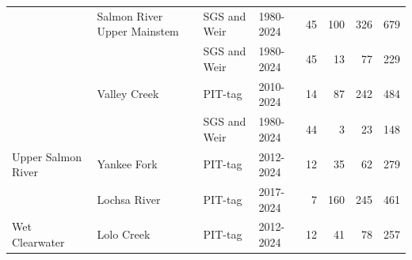 \documentclass[12pt,a4paper]{article}
\begin{document}
\begin{table}
\begin{tabular}[t]{llllrrrr}
 & Salmon River Upper Mainstem & SGS and Weir & 1980-2024 & 45 & 100 & 326 & 679\\

 &  & SGS and Weir & 1980-2024 & 45 & 13 & 77 & 229\\

 & \multirow[t]{-2}{*}{\raggedright\arraybackslash Valley Creek} & PIT-tag & 2010-2024 & 14 & 87 & 242 & 484\\

 &  & SGS and Weir & 1980-2024 & 44 & 3 & 23 & 148\\

\multirow[t]{-13}{*}[8\dimexpr\aboverulesep+\belowrulesep+\cmidrulewidth]{\raggedright\arraybackslash Upper Salmon River} & \multirow[t]{-2}{*}{\raggedright\arraybackslash Yankee Fork} & PIT-tag & 2012-2024 & 12 & 35 & 62 & 279\\

 & Lochsa River & PIT-tag & 2017-2024 & 7 & 160 & 245 & 461\\

\multirow[t]{-2}{*}[1\dimexpr\aboverulesep+\belowrulesep+\cmidrulewidth]{\raggedright\arraybackslash Wet Clearwater} & Lolo Creek & PIT-tag & 2012-2024 & 12 & 41 & 78 & 257\\
\bottomrule
\end{tabular}
\end{table}
\end{document}
